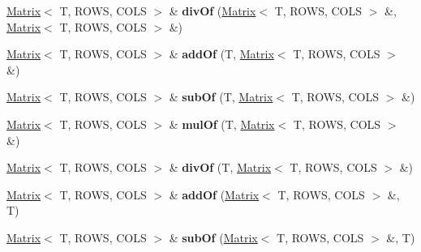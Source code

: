 \begin{DoxyCompactItemize}
\item 
\hypertarget{class_x_1_1_matrix_ab1f3e5c669f7584b16055913cb4f538f}{\hyperlink{class_x_1_1_matrix}{Matrix}$<$ T, R\-O\-W\-S, C\-O\-L\-S $>$ \& {\bfseries div\-Of} (\hyperlink{class_x_1_1_matrix}{Matrix}$<$ T, R\-O\-W\-S, C\-O\-L\-S $>$ \&, \hyperlink{class_x_1_1_matrix}{Matrix}$<$ T, R\-O\-W\-S, C\-O\-L\-S $>$ \&)}\label{class_x_1_1_matrix_ab1f3e5c669f7584b16055913cb4f538f}

\item 
\hypertarget{class_x_1_1_matrix_a8c18d62993f71d59fecf1d359a74021d}{\hyperlink{class_x_1_1_matrix}{Matrix}$<$ T, R\-O\-W\-S, C\-O\-L\-S $>$ \& {\bfseries add\-Of} (T, \hyperlink{class_x_1_1_matrix}{Matrix}$<$ T, R\-O\-W\-S, C\-O\-L\-S $>$ \&)}\label{class_x_1_1_matrix_a8c18d62993f71d59fecf1d359a74021d}

\item 
\hypertarget{class_x_1_1_matrix_addacb32638af825647a6b4f2952f1d68}{\hyperlink{class_x_1_1_matrix}{Matrix}$<$ T, R\-O\-W\-S, C\-O\-L\-S $>$ \& {\bfseries sub\-Of} (T, \hyperlink{class_x_1_1_matrix}{Matrix}$<$ T, R\-O\-W\-S, C\-O\-L\-S $>$ \&)}\label{class_x_1_1_matrix_addacb32638af825647a6b4f2952f1d68}

\item 
\hypertarget{class_x_1_1_matrix_a6da2d4a1604d164b402fd728c2df1e2a}{\hyperlink{class_x_1_1_matrix}{Matrix}$<$ T, R\-O\-W\-S, C\-O\-L\-S $>$ \& {\bfseries mul\-Of} (T, \hyperlink{class_x_1_1_matrix}{Matrix}$<$ T, R\-O\-W\-S, C\-O\-L\-S $>$ \&)}\label{class_x_1_1_matrix_a6da2d4a1604d164b402fd728c2df1e2a}

\item 
\hypertarget{class_x_1_1_matrix_a1e795cd35cc4fc12915fd1c9c6eafa49}{\hyperlink{class_x_1_1_matrix}{Matrix}$<$ T, R\-O\-W\-S, C\-O\-L\-S $>$ \& {\bfseries div\-Of} (T, \hyperlink{class_x_1_1_matrix}{Matrix}$<$ T, R\-O\-W\-S, C\-O\-L\-S $>$ \&)}\label{class_x_1_1_matrix_a1e795cd35cc4fc12915fd1c9c6eafa49}

\item 
\hypertarget{class_x_1_1_matrix_a7d1617d11137b067ebff88066a6a93ef}{\hyperlink{class_x_1_1_matrix}{Matrix}$<$ T, R\-O\-W\-S, C\-O\-L\-S $>$ \& {\bfseries add\-Of} (\hyperlink{class_x_1_1_matrix}{Matrix}$<$ T, R\-O\-W\-S, C\-O\-L\-S $>$ \&, T)}\label{class_x_1_1_matrix_a7d1617d11137b067ebff88066a6a93ef}

\item 
\hypertarget{class_x_1_1_matrix_a4d2ba824caff2cc99c2c024d4714f54f}{\hyperlink{class_x_1_1_matrix}{Matrix}$<$ T, R\-O\-W\-S, C\-O\-L\-S $>$ \& {\bfseries sub\-Of} (\hyperlink{class_x_1_1_matrix}{Matrix}$<$ T, R\-O\-W\-S, C\-O\-L\-S $>$ \&, T)}\label{class_x_1_1_matrix_a4d2ba824caff2cc99c2c024d4714f54f}


\end{DoxyCompactItemize}

